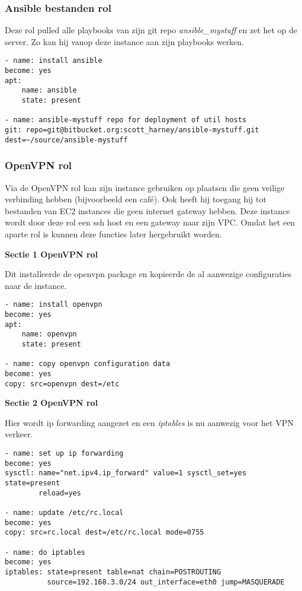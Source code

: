 \subsubsection{Ansible bestanden rol}
Deze rol pulled alle playbooks van \autocite{scottharney} zijn git repo \textit{ansible\_mystuff} en zet het op de server. Zo kan hij vanop deze instance aan zijn playbooks werken.
\begin{lstlisting}[basicstyle=\small]
- name: install ansible 
become: yes
apt:
    name: ansible
    state: present

- name: ansible-mystuff repo for deployment of util hosts
git: repo=git@bitbucket.org:scott_harney/ansible-mystuff.git  dest=~/source/ansible-mystuff    
\end{lstlisting}

\newpage
\subsubsection{OpenVPN rol}

Via de OpenVPN rol kan \autocite{scottharney} zijn instance gebruiken op plaatsen die geen veilige verbinding hebben (bijvoorbeeld een café). Ook heeft hij toegang hij tot bestanden van EC2 instances die geen internet gateway hebben. Deze instance wordt door deze rol een ssh host en een gateway naar \autocite{scottharney} zijn VPC. Omdat het een aparte rol is kunnen deze functies later hergebruikt worden.

\textbf{Sectie 1 OpenVPN rol}

Dit installeerde de openvpn package en kopieerde de al aanwezige configuraties naar de instance.
\begin{lstlisting}[basicstyle=\small]
- name: install openvpn
become: yes
apt:
    name: openvpn
    state: present

- name: copy openvpn configuration data
become: yes
copy: src=openvpn dest=/etc
\end{lstlisting}

\textbf{Sectie 2 OpenVPN rol}

Hier wordt ip forwarding aangezet en een \textit{iptables} is nu aanwezig voor het VPN verkeer.
\begin{lstlisting}[basicstyle=\small]
- name: set up ip forwarding
become: yes
sysctl: name="net.ipv4.ip_forward" value=1 sysctl_set=yes state=present 
		reload=yes

- name: update /etc/rc.local
become: yes
copy: src=rc.local dest=/etc/rc.local mode=0755

- name: do iptables
become: yes
iptables: state=present table=nat chain=POSTROUTING 
	  	  source=192.168.3.0/24 out_interface=eth0 jump=MASQUERADE
\end{lstlisting}

